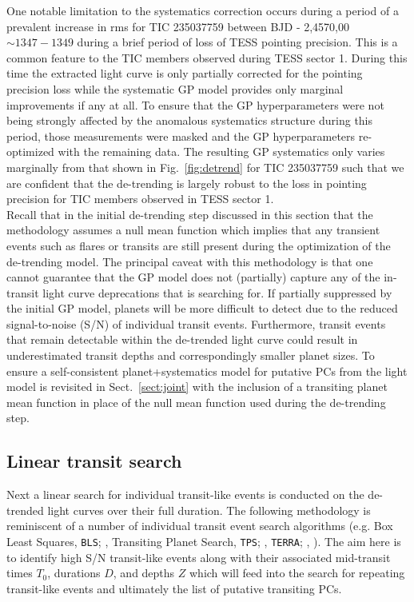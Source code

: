 One notable limitation to the systematics correction occurs during a period of a prevalent increase
in rms for TIC 235037759 between BJD - 2,4570,00 $\sim 1347-1349$ during a brief period of loss of
TESS pointing precision.  This is a common feature to
the TIC members observed during TESS sector 1. During this time the extracted light curve is only
partially corrected for the pointing precision loss while the systematic GP model provides only marginal
improvements if any at all.
To ensure that the GP hyperparameters were not being strongly affected by the anomalous systematics structure
during this period, those measurements were masked and the GP hyperparameters re-optimized with the
remaining data. The resulting GP systematics only varies marginally from that shown in
Fig.~\ref{fig:detrend} for TIC 235037759 such that we are confident that the \pipeline{} de-trending is
largely robust to the loss in pointing precision for TIC members observed in TESS sector 1. \\

Recall that in the initial de-trending step discussed in this section that the methodology
assumes a null mean function which implies that any transient events such as flares or transits are still
present during the optimization of the de-trending model.
The principal caveat with this methodology is that one cannot guarantee
that the GP model does not (partially) capture any of the in-transit light curve deprecations that
\pipeline{} is searching for. If partially suppressed by the initial GP model, planets will be more
difficult to detect due to the reduced signal-to-noise (S/N) of individual transit events.
Furthermore, transit events
that remain detectable within the de-trended light curve could result in underestimated transit depths
and correspondingly smaller planet sizes. To ensure a self-consistent planet+systematics model
for putative PCs from \pipeline{,} the light model is revisited in Sect.~\ref{sect:joint}
with the inclusion of a transiting planet mean function in place of the null mean function used during
the de-trending step.

\subsection{Linear transit search} \label{sect:linearsearch}
Next a linear search for individual transit-like events is conducted on the de-trended light curves over
their full duration. The following methodology is reminiscent of a number of individual transit event
search algorithms
(e.g. Box Least Squares, \texttt{BLS}; \citealt{kovacs02}, Transiting Planet Search, \texttt{TPS};
\citealt{jenkins10,christiansen13,christiansen15,christiansen16}, \texttt{TERRA};
\citealt{petigura13a}, \citealt{foremanmackey15a}). The aim here is
to identify high S/N transit-like events along with their associated mid-transit times $T_0$,
durations $D$, and depths $Z$ which will feed into the search for repeating transit-like
events and ultimately the list of putative transiting PCs. \\

